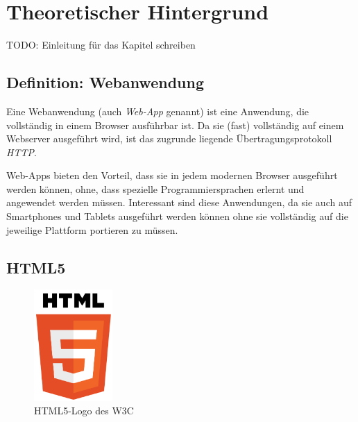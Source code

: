 \chapter{Theoretischer Hintergrund}
TODO: Einleitung für das Kapitel schreiben

\section{Definition: Webanwendung}
Eine Webanwendung (auch \emph{Web-App} genannt) ist eine Anwendung, die vollständig in einem Browser ausführbar ist. Da sie (fast) vollständig auf einem Webserver ausgeführt wird, ist das zugrunde liegende Übertragungsprotokoll \emph{HTTP}.\par

Web-Apps bieten den Vorteil, dass sie in jedem modernen Browser ausgeführt werden können, ohne, dass spezielle Programmiersprachen erlernt und angewendet werden müssen. Interessant sind diese Anwendungen, da sie auch auf Smartphones und Tablets ausgeführt werden können ohne sie vollständig auf die jeweilige Plattform portieren zu müssen.

\section{HTML5}
\begin{figure}[!ht]
	\centering
	\includegraphics[width=3cm]{fig/html5_logo}
	\caption{{HTML5-Logo des W3C}\cite{html5:logo}}
\end{figure}